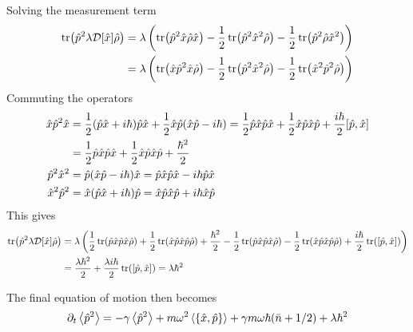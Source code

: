 Solving the measurement term
\begin{align}
    \tr(\hat{p}^2 \lambda \mathcal{D}[\hat{x}] \hat{\rho}) &= \lambda \left( \tr(\hat{p}^2 \hat{x} \hat{\rho} \hat{x}) - \frac{1}{2}\tr(\hat{p}^2 \hat{x}^2 \hat{\rho}) - \frac{1}{2} \tr(\hat{p}^2 \hat{\rho} \hat{x}^2) \right)\\
    &= \lambda \left( \tr(\hat{x} \hat{p}^2 \hat{x} \hat{\rho}) - \frac{1}{2} \tr(\hat{p}^2 \hat{x}^2 \hat{\rho}) - \frac{1}{2} \tr(\hat{x}^2 \hat{p}^2 \hat{\rho}) \right)
\end{align}
Commuting the operators
\begin{align}
    \xop \pop^2 \xop &= \frac{1}{2}(\pop\xop + i\hbar)\pop\xop + \frac{1}{2}\xop\pop(\xop\pop -i\hbar) = \frac{1}{2}\pop\xop\pop\xop + \frac{1}{2} \xop\pop\xop\pop + \frac{i\hbar}{2} \comm{\pop}{\xop}\\
    &=\frac{1}{2}\pop\xop\pop\xop + \frac{1}{2} \xop\pop\xop\pop +\frac{\hbar^2}{2}\\
    \pop^2 \xop^2 &= \pop (\xop\pop -i\hbar)\xop = \pop\xop\pop\xop - i\hbar \pop\xop\\
    \xop^2 \pop^2 &= \xop(\pop\xop + i\hbar)\pop = \xop\pop\xop\pop + i\hbar \xop\pop
\end{align}
This gives 
\begin{align}
    \tr(\pop^2 \lambda \super{\xop} \dmatrix) &= \lambda \left(  \frac{1}{2}\tr(\pop\xop\pop\xop \dmatrix) + \frac{1}{2} \tr(\xop\pop\xop\pop\dmatrix) + \frac{\hbar^2}{2} -\frac{1}{2}\tr(\pop\xop\pop\xop \dmatrix) - \frac{1}{2} \tr(\xop\pop\xop\pop\dmatrix) + \frac{i\hbar}{2}\tr(\comm{\pop}{\xop}) \right)\\
    &= \frac{\lambda \hbar^2}{2} + \frac{\lambda i \hbar}{2} \tr(\comm{\pop}{\xop}) = \lambda \hbar^2
\end{align}

The final equation of motion then becomes
\begin{equation}
    \dt\expval{\pop^2} = -\gamma \expval{\pop^2} + m\omega^2 \expval{\acomm{\xop}{\pop}} + \gamma m \omega\hbar (\nbar + 1/2) + \lambda \hbar^2
\end{equation}


